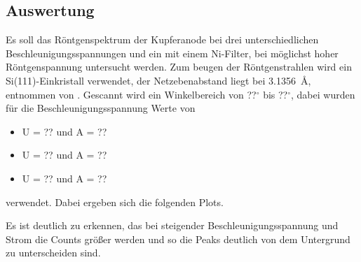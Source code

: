 \subsection{Auswertung}
Es soll das Röntgenspektrum der Kupferanode bei drei unterschiedlichen Beschleunigungsspannungen und ein mit einem Ni-Filter, bei möglichst hoher Röntgenspannung untersucht werden.
Zum beugen der Röntgenstrahlen wird ein Si(111)-Einkristall verwendet, der Netzebenabstand liegt bei \SI{3,1356}{\angstrom}, entnommen von \cite{si_a}.
Gescannt wird ein Winkelbereich von ??$^\circ$ bis ??$^\circ$, dabei wurden für die Beschleunigungsspannung Werte von
\begin{itemize}
\item U = ?? und A = ??
\item U = ?? und A = ??
\item U = ?? und A = ??
\end{itemize}
 verwendet. Dabei ergeben sich die folgenden Plots.
 
 
 
 Es ist deutlich zu erkennen, das bei steigender Beschleunigungsspannung und Strom die Counts größer werden und so die Peaks deutlich von dem Untergrund zu unterscheiden sind.